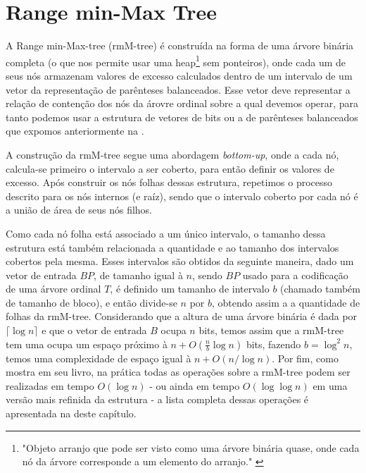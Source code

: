 \section{Range min-Max Tree}\label{sec:sec-classic-rmm-tree}
A Range min-Max-tree (rmM-tree) é construída na forma de uma árvore binária completa (o que nos permite usar uma heap\footnote{"Objeto arranjo que pode ser visto como uma árvore binária quase,
onde cada nó da árvore corresponde a um elemento do arranjo." \citet{book-algoritmos-teoria-pratica}} sem ponteiros), onde cada um de seus nós armazenam valores de excesso calculados dentro de um intervalo de um vetor da representação de parênteses balanceados. Esse vetor deve representar a relação de contenção dos nós da árovre ordinal sobre a qual devemos operar, para tanto podemos usar a estrutura de vetores de bits ou a de parênteses balanceados  que expomos anteriormente na . 

A construção da rmM-tree segue uma abordagem \textit{bottom-up}, onde a cada nó, calcula-se primeiro o intervalo a ser coberto, para então definir os  valores de excesso. Após construir os nós folhas dessas estrutura, repetimos o processo descrito para os nós internos (e raíz), sendo que o intervalo coberto por cada nó é a união de área de seus nós filhos.


Como cada nó folha está associado a um único intervalo, o tamanho dessa estrutura está também relacionada a quantidade e ao tamanho dos intervalos cobertos pela mesma. 
Esses intervalos são obtidos da seguinte maneira, dado um vetor de entrada $BP$, de  tamanho igual à $n$, sendo $BP$ usado para a codificação de uma árvore ordinal $T$, é definido um tamanho de intervalo $b$ (chamado também de tamanho de bloco), e então divide-se $n$ por $b$, obtendo assim a a quantidade de folhas da rmM-tree.
Considerando que a altura de uma árvore binária é dada por $\lceil \log n \rceil$ e que o vetor de entrada $B$ ocupa $n$ bits, temos assim que a rmM-tree tem uma ocupa um espaço próximo à $n + O(\frac{n}{b} \log n)$ bits, fazendo $b = \log^2 n$, temos uma complexidade de espaço igual à $n + O(n/\log n)$. Por fim,  como mostra \citet{book-compact-data-structures} 
em seu livro, na prática todas as operações sobre a rmM-tree podem ser realizadas em tempo $O(\log n)$ - ou ainda em tempo $O(\log \log n)$ em uma versão mais refinida da estrutura - a lista completa dessas operações é apresentada na  deste capítulo.

